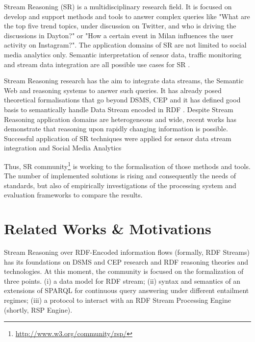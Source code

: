 Stream Reasoning (SR) is a multidisciplinary research field. It is focused on develop and support methods and tools to answer complex queries like "What are the top five trend topics, under discussion on Twitter, and who is driving the discussions in Dayton?" or "How a certain event in Milan influences the user activity on Instagram?". The application domains of SR are not limited to social media analytics only. Semantic interpretation of sensor data, traffic monitoring and stream data integration are all possible use cases for SR \cite{DBLP:journals/expert/ValleCHF09}.

Stream Reasoning research has the aim to integrate data streams, the Semantic Web and reasoning systems to answer such queries. It has already posed theoretical formalisations that go beyond DSMS, CEP  \cite{DBLP:conf/debs/KomazecCF12, Lephuoc2011, 4618773} and it has defined good basis to semantically handle Data Stream encoded in RDF \cite{DBLP:conf/fis/ValleCBBC08, DBLP:journals/sigmod/BarbieriBCVG10}. Despite Stream Reasoning application domains are heterogeneous and wide, recent works has demonstrate that reasoning upon rapidly changing information is possible. Successful application of SR techniques were applied for sensor data stream integration \cite{DBLP:journals/ijswis/CalbimonteJCA12,DBLP:journals/ws/LecueTHTBST14}  and Social Media Analytics \cite{DBLP:journals/ws/BalduiniCDVHLKT12}

Thus, SR community\footnote{\url{http://www.w3.org/community/rsp/}} is working to the formalisation of those methods and tools. The number of implemented solutions is rising and consequently the needs of standards, but also of empirically investigations of the processing system and evaluation frameworks to compare the results.


\section{Related Works \& Motivations}\label{sec:motivations-intro}

Stream Reasoning over RDF-Encoded information flows (formally, RDF Streams) has its foundations on DSMS and CEP research and RDF reasoning theories and technologies. At this moment, the community is focused on the formalization of three points.  (i) a data model for RDF stream; (ii) syntax and semantics of an extensions of SPARQL for continuous query answering under different entailment regimes; (iii) a protocol to interact with an RDF Stream Processing Engine (shortly, RSP Engine). 

